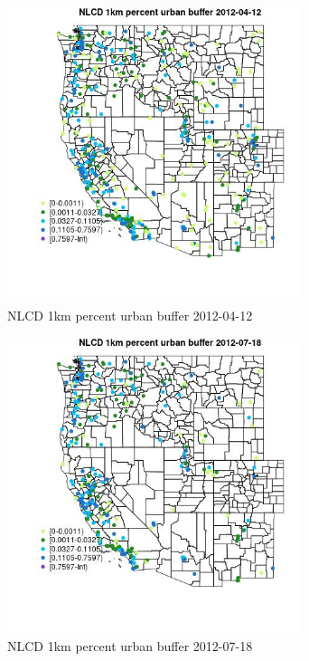 \begin{figure} 
\centering  
\includegraphics[width=0.77\textwidth]{Code_Outputs/Report_ML_input_PM25_Step4_part_e_de_duplicated_aves_compiled_2019-05-14wNAs_MapObsNLCD_1km_percent_urban_buffer2012-04-12.jpg} 
\caption{\label{fig:Report_ML_input_PM25_Step4_part_e_de_duplicated_aves_compiled_2019-05-14wNAsMapObsNLCD_1km_percent_urban_buffer2012-04-12}NLCD 1km percent urban buffer 2012-04-12} 
\end{figure} 
 

\clearpage 

\begin{figure} 
\centering  
\includegraphics[width=0.77\textwidth]{Code_Outputs/Report_ML_input_PM25_Step4_part_e_de_duplicated_aves_compiled_2019-05-14wNAs_MapObsNLCD_1km_percent_urban_buffer2012-07-18.jpg} 
\caption{\label{fig:Report_ML_input_PM25_Step4_part_e_de_duplicated_aves_compiled_2019-05-14wNAsMapObsNLCD_1km_percent_urban_buffer2012-07-18}NLCD 1km percent urban buffer 2012-07-18} 
\end{figure} 
 

